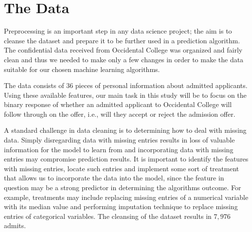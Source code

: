 \documentclass[11pt, oneside]{article}   	%
\begin{document}
\section{The Data}
\label{sec:data}
Preprocessing is an important step in any data science project; the aim is to cleanse the dataset and prepare it to be further used in a prediction algorithm.
The confidential data received from Occidental College was organized and fairly clean and thus we needed to make only a few changes in order to make the data suitable for our chosen machine learning algorithms. 

The data consists of 36 pieces of personal information about admitted applicants.  Using these available features, our main task in this study will be to focus on the binary response of whether an admitted applicant to Occidental College will follow through on the offer, i.e., will they accept or reject the admission offer. 

A standard challenge in data cleaning is to determining how to deal with missing data. Simply disregarding data with missing entries results in loss of valuable information for the model to learn from and incorporating data with missing entries may compromise prediction results. It is important to identify the features with missing entries, locate such entries and implement some sort of treatment that allows us to incorporate the data into the model, since the feature in question may be a strong predictor in determining the algorithms outcome. For example, treatments may include replacing missing entries of a numerical variable with its median value and performing imputation technique to replace missing entries of categorical variables. The cleansing of the dataset results in $7,976$ admits.
\end{document}
